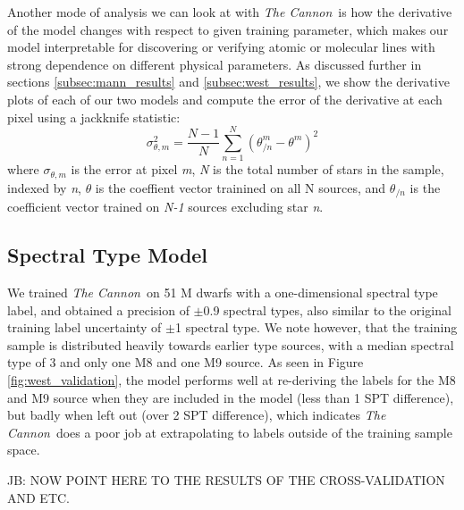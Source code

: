 \documentclass[modern]{aastex62}
\newcommand{\thecannon}{\textsl{The Cannon}}
\begin{document}
Another mode of analysis we can look at with \thecannon\ is how the derivative of the model changes with respect to given training parameter, which makes our model interpretable for discovering or verifying atomic or molecular lines with strong dependence on different physical parameters. As discussed further in sections \ref{subsec:mann_results} and \ref{subsec:west_results}, we show the derivative plots of each of our two models and compute the error of the derivative at each pixel using a jackknife statistic:
\begin{equation}
	\sigma_{\theta,m}^2 = \frac{N-1}{N} \sum^N_{n=1} (\theta_{/n}^m - \theta^m)^2 
\end{equation}
where $\sigma_{\theta,m}$ is the error at pixel \emph{m}, \emph{N} is the total number of stars in the sample, indexed by \emph{n}, $\theta$ is the coeffient vector trainined on all N sources, and $\theta_{/n}$ is the coefficient vector trained on \emph{N-1} sources excluding star \emph{n}.

\color{gcolor}{Some note on what lines vary significantly with parameter...}\color{black}

\color{gcolor}{HOGG: Some commentary on why $\chi^2$ is higher than expected.}\color{black}

\subsection{Spectral Type Model \label{subsec:west_results}}
We trained \thecannon\ on 51 M dwarfs with a one-dimensional spectral type label, and obtained a precision of $\pm$0.9 spectral types, also similar to the original training label uncertainty of $\pm$1 spectral type. We note however, that the training sample is distributed heavily towards earlier type sources, with a median spectral type of 3 and only one M8 and one M9 source. As seen in Figure \ref{fig:west_validation}, the model performs well at re-deriving the labels for the M8 and M9 source when they are included in the model (less than 1 SPT difference), but badly when left out (over 2 SPT difference), which indicates \thecannon\ does a poor job at extrapolating to labels outside of the training sample space. 

JB: NOW POINT HERE TO THE RESULTS OF THE CROSS-VALIDATION AND ETC.

\color{gcolor}{Further assessment of the reliability of our model for late types?...}\color{black}
\end{document}
